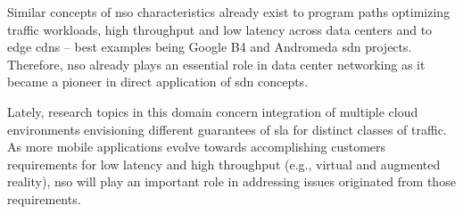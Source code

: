 
Similar concepts of \gls{nso} characteristics already exist to program paths optimizing traffic workloads, high throughput and low latency across data centers and to edge \glspl{cdn} -- best examples being Google B4 and Andromeda \gls{sdn} projects. Therefore, \gls{nso} already plays an essential role in data center networking as it became a pioneer in direct application of \gls{sdn} concepts. 

Lately, research topics in this domain concern integration of multiple cloud environments envisioning different guarantees of \gls{sla} for distinct classes of traffic. As more mobile applications evolve towards accomplishing customers requirements for low latency and high throughput (e.g., virtual and augmented reality), \gls{nso} will play an important role in addressing issues originated from those requirements.  







